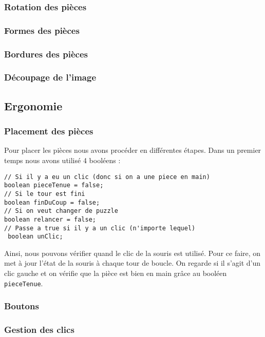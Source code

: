\documentclass[]{article}
\newcommand{\variable}[1]{\noindent \texttt{#1}}
\begin{document}
\subsubsection{Rotation des pièces}
\subsubsection{Formes des pièces}
\subsubsection{Bordures des pièces}
\subsubsection{Découpage de l'image}


\subsection{Ergonomie}
\subsubsection{Placement des pièces}

Pour placer les pièces nous avons procéder en différentes étapes. Dans un premier temps nous avons utilisé 4 booléens : 
\begin{lstlisting}
// Si il y a eu un clic (donc si on a une piece en main)
boolean pieceTenue = false;
// Si le tour est fini
boolean finDuCoup = false;
// Si on veut changer de puzzle
boolean relancer = false;
// Passe a true si il y a un clic (n'importe lequel)
 boolean unClic;
\end{lstlisting}
Ainsi, nous pouvons vérifier quand le clic de la souris est utilisé. 
Pour ce faire, on met à jour l'état de la souris à chaque tour de boucle. On regarde si il s'agit d'un clic gauche et on vérifie que la pièce est bien en main grâce au booléen \variable{pieceTenue}.

\subsubsection{Boutons}
\subsubsection{Gestion des clics}
\end{document}
